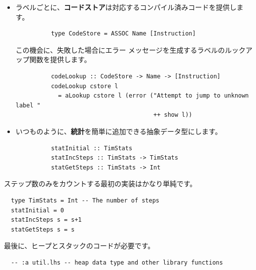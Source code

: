 \documentclass{jbook}
\begin{document}
\begin{itemize}
\begin{verbatim}
          fAlloc heap xs = (heap', FrameAddr addr)
                           where
                           (heap', addr) = hAlloc heap xs

          fGet heap (FrameAddr addr) n = f !! (n-1)
                                         where
                                           f = hLookup heap addr

          fUpdate heap (FrameAddr addr) n closure
            = hUpdate heap addr new_frame
              where
                frame = hLookup heap addr
                new_frame = take (n-1) frame ++ [closure] ++ drop n frame

          fList f = f
        \end{verbatim}
	\item ラベルごとに、\textbf{コードストア}は対応するコンパイル済みコードを提供します。
	      \begin{verbatim}
          type CodeStore = ASSOC Name [Instruction]
        \end{verbatim}
	      この機会に、失敗した場合にエラー メッセージを生成するラベルのルックアップ関数を提供します。
	      \begin{verbatim}
          codeLookup :: CodeStore -> Name -> [Instruction]
          codeLookup cstore l
            = aLookup cstore l (error ("Attempt to jump to unknown label "
                                       ++ show l))
        \end{verbatim}
	\item いつものように、\textbf{統計}を簡単に追加できる抽象データ型にします。
	      \begin{verbatim}
          statInitial :: TimStats
          statIncSteps :: TimStats -> TimStats
          statGetSteps :: TimStats -> Int
        \end{verbatim}
\end{itemize}

ステップ数のみをカウントする最初の実装はかなり単純です。

\begin{verbatim}
  type TimStats = Int -- The number of steps
  statInitial = 0
  statIncSteps s = s+1
  statGetSteps s = s
\end{verbatim}

最後に、ヒープとスタックのコードが必要です。

\begin{verbatim}
  -- :a util.lhs -- heap data type and other library functions
\end{verbatim}
\end{document}
